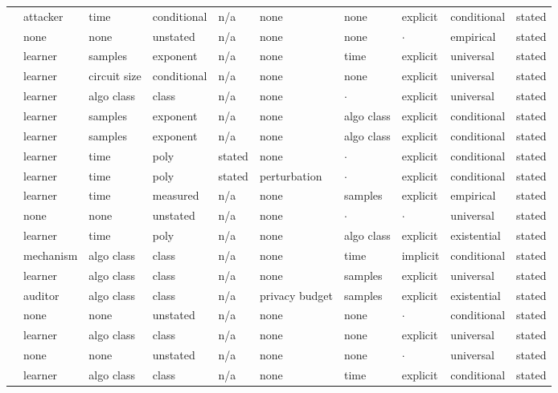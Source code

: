 \begin{landscape}
\begin{longtable}{rlllllllll}
\cite{AHY25} & attacker & time & conditional & n/a & none & none & explicit & conditional & stated \\
\cite{SHMWGWS26} & none & none & unstated & n/a & none & none & $\cdot$ & empirical & stated \\
\cite{KJWSM26} & learner & samples & exponent & n/a & none & time & explicit & universal & stated \\
\cite{GJW22} & learner & circuit size & conditional & n/a & none & none & explicit & universal & stated \\
\cite{GJW20} & learner & algo class & class & n/a & none & $\cdot$ & explicit & universal & stated \\
\cite{DPLB24} & learner & samples & exponent & n/a & none & algo class & explicit & conditional & stated \\
\cite{DLB25} & learner & samples & exponent & n/a & none & algo class & explicit & conditional & stated \\
\cite{LZZ25} & learner & time & poly & stated & none & $\cdot$ & explicit & conditional & stated \\
\cite{SZB21} & learner & time & poly & stated & perturbation & $\cdot$ & explicit & conditional & stated \\
\cite{BEGKMZ22} & learner & time & measured & n/a & none & samples & explicit & empirical & stated \\
\cite{HS24} & none & none & unstated & n/a & none & $\cdot$ & $\cdot$ & universal & stated \\
\cite{HW21} & learner & time & poly & n/a & none & algo class & explicit & existential & stated \\
\cite{YHGA25} & mechanism & algo class & class & n/a & none & time & implicit & conditional & stated \\
\cite{AGJ21} & learner & algo class & class & n/a & none & samples & explicit & universal & stated \\
\cite{DM22} & auditor & algo class & class & n/a & privacy budget & samples & explicit & existential & stated \\
\cite{BLMST22} & none & none & unstated & n/a & none & none & $\cdot$ & conditional & stated \\
\cite{EGV25} & learner & algo class & class & n/a & none & none & explicit & universal & stated \\
\cite{SKMTO26} & none & none & unstated & n/a & none & none & $\cdot$ & universal & stated \\
\cite{ABM23} & learner & algo class & class & n/a & none & time & explicit & conditional & stated \\

\end{longtable}
\end{landscape}
